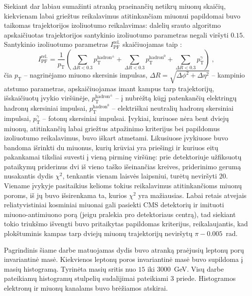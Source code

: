 \documentclass[a4paper, 12pt, oneside]{article}
\newcommand{\pT}{p_{\mathrm{T}}}
\newlength\q
\begin{document}
Siekiant dar labiau sumažinti atranką praeinančių netikrų miuonų skaičių, kiekvienam labai griežtus reikalavimus
atitinkančiam miuonui papildomai buvo taikomas trajektorijos izoliuotumo reikalavimas: dalelių srauto algoritmo
apskaičiuotas trajektorijos santykinio izoliuotumo parametras negali viršyti $0.15$.
Santykinio izoliuotumo parametras $I^{\mathrm{rel.}}_{\mathrm{PF}}$ skaičiuojamas taip \cite{ParticleFlow}:
\begin{equation}
	\label{eq:isolation}
	I^{\mathrm{rel.}}_{\mathrm{PF}} = \frac{1}{p_{\mathrm{T}}} 
	\left( \sum_{\Delta R<0.3} p_{\mathrm{T}}^{\mathrm{hadron^{\pm}}} +
	\sum_{\Delta R<0.3} p_{\mathrm{T}}^{\mathrm{hadron^0}} + 
	\sum_{\Delta R<0.3} p_{\mathrm{T}}^{\gamma} \right) \; \mathrm{,}
\end{equation}
čia $\pT$ -- nagrinėjamo miuono skersinis impulsas, $\Delta R = \sqrt{\Delta \phi^{2} + \Delta \eta^{2}}$ -- kampinio atstumo
parametras, apskaičiuojamas imant kampus tarp trajektorijų, išskaičiuotų įvykio viršūnėje, $p_{\mathrm{T}}^{\mathrm{hadron^{\pm}}}$
-- į nubrėžtą kūgį patenkančių elektringų hadronų skersiniai impulsai, $p_{\mathrm{T}}^{\mathrm{hadron^0}}$ -- elektriškai neutralių
hadronų skersiniai impulsai,  $p_{\mathrm{T}}^{\gamma}$ -- fotonų skersiniai impulsai.
Įvykiai, kuriuose nėra bent dviejų miuonų, atitinkančių labai griežtus atpažinimo kriterijus bei papildomus izoliuotumo
reikalavimus, buvo iškart atmetami.
Likusiuose įvykiuose buvo bandoma išrinkti du miuonus, kurių krūviai yra priešingi ir kuriuos eitų pakankamai tiksliai
suvesti į vieną pirminę viršūnę: prie detektoriuje užfiksuotų pataikymų priderinus dvi iš vieno taško išeinančias kreives,
priderinimo gerumą nusakantis dydis $\chi^2$, tenkantis vienam laisvės laipsniui, turėtų neviršyti $20$.
Viename įvykyje pasitaikius kelioms tokius reikalavimus atitinkančioms miuonų poroms, iš jų buvo išsirenkama ta, kurios
$\chi^2$ yra mažiausias.
Labai retais atvejais reliatyvistiniai kosminiai miuonai gali pasiekti CMS detektorių ir imituoti miuono-antimiuono porą
(jeigu pralekia pro detektoriaus centrą), tad siekiant tokio triukšmo išvengti buvo pritaikytas papildomas kriterijus,
reikalaujantis, kad plokštuminis kampas tarp dviejų miuonų trajektorijų neviršytų $\pi-0.005$~rad.

Pagrindinis šiame darbe matuojamas dydis buvo atranką praėjusių leptonų porų invariantinė masė.
Kiekvienos leptonų poros invariantinė masė buvo supildoma į masių histogramą.
Tyrinėta masių sritis nuo $15$ iki $3000$~GeV.
Visų darbe pateikiamų histogramų stulpelių sudalijimai pateikiami 3 priede.
Histogramos elektronų ir miuonų kanalams buvo brėžiamos atskirai.
\end{document}
